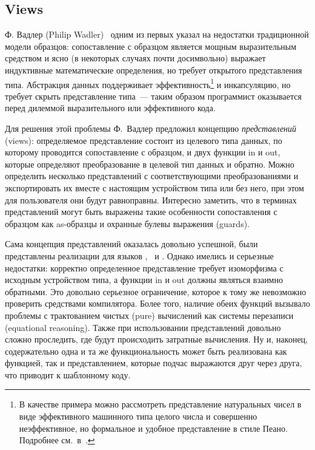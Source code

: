 
\subsection{Views}
Ф. Вадлер (Philip Wadler)~\cite{wadler1987views} одним из первых указал на недостатки традиционной модели образцов: сопоставление с образцом является мощным выразительным средством и ясно (в некоторых случаях почти досимвольно) выражает индуктивные математические определения, но требует открытого представления типа. Абстракция данных поддерживает \mbox{эффективность}\footnote{В качестве примера можно рассмотреть представление натуральных чисел в виде эффективного машинного типа целого числа и совершенно неэффективное, но формальное и удобное представление в стиле
Пеано. Подробнее см.~в~\cite{wadler1987views}.} и инкапсуляцию, но требует скрыть представление типа~--- таким образом программист оказывается перед дилеммой выразительного или эффективного кода. 

Для решения этой проблемы Ф.~Вадлер предложил концепцию \textit{представлений} (views): определяемое представление состоит из целевого типа данных, по которому проводится сопоставление с образцом, и двух функции in и out, которые определяют преобразование в  целевой тип данных и обратно. Можно определить несколько представлений с соответствующими преобразованиями и экспортировать их вместе с настоящим устройством типа или без него, при этом для пользователя они будут равноправны. Интересно заметить, что в терминах представлений могут быть выражены такие особенности сопоставления с образцом как as-образцы и охранные булевы выражения (guards).

Сама концепция представлений оказалась довольно успешной, были представлены реализации для языков \Miranda, \SML~и \Haskell. Однако имелись и серьезные недостатки: корректно определенное представление требует изоморфизма с исходным устройством типа, а функции in и out должны являться взаимно обратными. Это довольно серьезное ограничение, которое к тому же невозможно проверить средствами компилятора. Более того, наличие обеих функций вызывало проблемы с трактованием чистых (pure) вычислений как системы перезаписи (equational reasoning). Также при использовании представлений довольно сложно проследить, где будут происходить затратные вычисления. Ну и, наконец, содержательно одна и та же функциональность может быть реализована как функцией, так и представлением, которые подчас выражаются друг через друга, что приводит к шаблонному коду.

